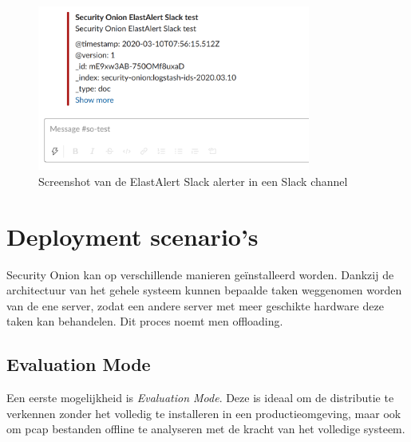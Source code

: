 \documentclass[a4paper, 12pt]{report}
\begin{document}
\begin{figure}[H]
  \centering
  \includegraphics[width=0.8\textwidth]{elastalert-slack}
  \caption{Screenshot van de ElastAlert Slack alerter in een Slack channel}
  \label{fig:elastalert-slack}
\end{figure}

\section{Deployment scenario's}
Security Onion kan op verschillende manieren geïnstalleerd worden.
Dankzij de architectuur van het gehele systeem kunnen bepaalde taken weggenomen worden van de ene server, zodat een andere server met meer geschikte hardware deze taken kan behandelen.
Dit proces noemt men offloading.

\subsection{Evaluation Mode}
Een eerste mogelijkheid is \emph{Evaluation Mode}.
Deze is ideaal om de distributie te verkennen zonder het volledig te installeren in een productieomgeving, maar ook om pcap bestanden offline te analyseren met de kracht van het volledige systeem.
\end{document}
